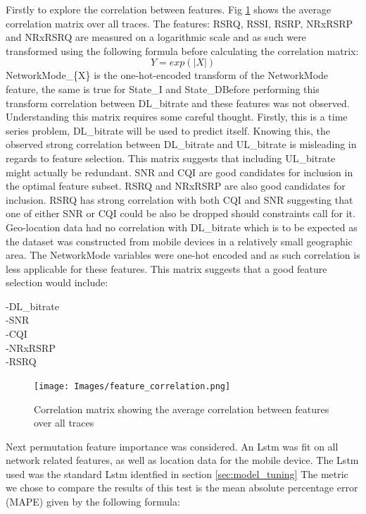Firstly to explore the correlation between features. Fig \ref{fig:feature_correlation} shows the average correlation matrix over all traces. The features: RSRQ, RSSI, RSRP, NRxRSRP and NRxRSRQ are measured on a logarithmic scale and as such were transformed using the following formula before calculating the correlation matrix:
\begin{equation}
Y = exp(\left|X\right|)
\end{equation}
NetworkMode\_\{X\} is the one-hot-encoded transform of the NetworkMode feature, the same is true for State\_I and State\_DBefore performing this transform correlation between DL\_bitrate and these features was not observed. Understanding this matrix requires some careful thought. Firstly, this is a time series problem, DL\_bitrate will be used to predict itself. Knowing this, the observed strong correlation between DL\_bitrate and UL\_bitrate is misleading in regards to feature selection. This matrix suggests that including UL\_bitrate might actually be redundant. SNR and CQI are good candidates for inclusion in the optimal feature subset. RSRQ and NRxRSRP are also good candidates for inclusion. RSRQ has strong correlation with both CQI and SNR suggesting that one of either SNR or CQI could be also be dropped should constraints call for it. Geo-location data had no correlation with DL\_bitrate which is to be expected as the dataset was constructed from mobile devices in a relatively small geographic area. The NetworkMode variables were one-hot encoded and as such correlation is less applicable for these features. This matrix suggests that a good feature selection would include:

-DL\_bitrate \\
-SNR \\
-CQI \\
-NRxRSRP \\
-RSRQ \\

\newpage
\begin{figure}[h]
\texttt{[image: Images/feature\_correlation.png]}
\centering
\caption{Correlation matrix showing the average correlation between features over all traces}
\label{fig:feature_correlation}
\end{figure}

Next permutation feature importance was considered. An Lstm was fit on all network related features, as well as location data for the mobile device. The Lstm used was the standard Lstm identfied in section \ref{sec:model_tuning} The metric we chose to compare the results of this test is the mean absolute percentage error (MAPE) given by the following formula: \\

